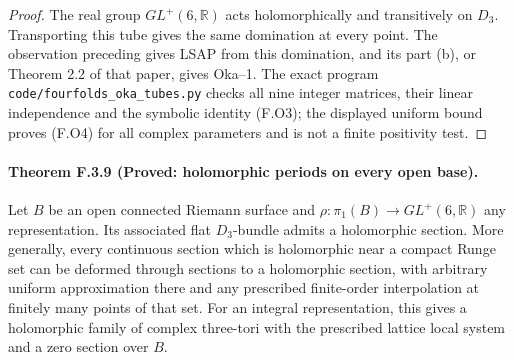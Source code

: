 \begin{proof}
The real group $GL^+(6,\mathbb R)$ acts holomorphically and
transitively on $D_3$.  Transporting this tube gives the same
domination at every point.  The observation preceding
\cite[Proposition 7.13]{ffAlarconForstneric25} gives LSAP from
this domination, and its part (b), or Theorem 2.2 of that paper,
gives Oka--1.  The exact program
\texttt{code/fourfolds\_oka\_tubes.py} checks all nine integer
matrices, their linear independence and the symbolic identity
(F.O3); the displayed uniform bound proves (F.O4) for all complex
parameters and is not a finite positivity test.
\end{proof}

\paragraph{Theorem F.3.9 (Proved: holomorphic periods on every open base).}
Let $B$ be an open connected Riemann surface and
$\rho:\pi_1(B)\to GL^+(6,\mathbb R)$ any representation.
Its associated flat $D_3$-bundle admits a holomorphic section.
More generally, every continuous section which is holomorphic
near a compact Runge set can be deformed through sections to a
holomorphic section, with arbitrary uniform approximation there
and any prescribed finite-order interpolation at finitely many
points of that set.  For an integral representation, this gives
a holomorphic family of complex three-tori with the prescribed
lattice local system and a zero section over $B$.

